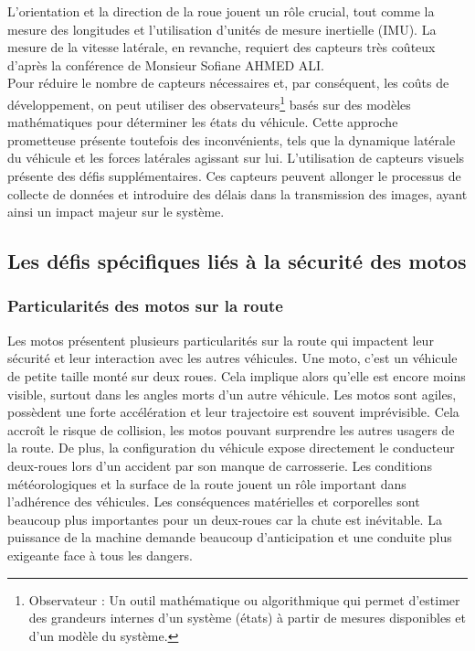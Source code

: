 L'orientation et la direction de la roue jouent un rôle crucial, tout comme la mesure des longitudes et l'utilisation d'unités de mesure inertielle (IMU). La mesure de la vitesse latérale, en revanche, requiert des capteurs très coûteux d'après la conférence\cite{ahmed_ali_synthese_2024} de Monsieur Sofiane AHMED ALI.\\
Pour réduire le nombre de capteurs nécessaires et, par conséquent, les coûts de développement, on peut utiliser des observateurs\footnote{Observateur : Un outil mathématique ou algorithmique qui permet d’estimer des grandeurs internes d’un système (états) à partir de mesures disponibles et d’un modèle du système.} basés sur des modèles mathématiques pour déterminer les états du véhicule. Cette approche prometteuse présente toutefois des inconvénients, tels que la dynamique latérale du véhicule et les forces latérales agissant sur lui.
L'utilisation de capteurs visuels présente des défis supplémentaires. Ces capteurs peuvent allonger le processus de collecte de données et introduire des délais dans la transmission des images, ayant ainsi un impact majeur sur le système.


\newpage
\subsection{Les défis spécifiques liés à la sécurité des motos}

\subsubsection{Particularités des motos sur la route}
Les motos présentent plusieurs particularités sur la route qui impactent leur sécurité et leur interaction avec les autres véhicules.
Une moto, c'est un véhicule de petite taille monté sur deux roues. Cela implique alors qu'elle est encore moins visible, surtout dans les angles morts d'un autre véhicule. Les motos sont agiles, possèdent une forte accélération et leur trajectoire est souvent imprévisible.  Cela accroît le risque de collision, les motos pouvant surprendre les autres usagers de la route. De plus, la configuration du véhicule expose directement le conducteur deux-roues lors d'un accident par son manque de carrosserie. Les conditions météorologiques et la surface de la route jouent un rôle important dans l'adhérence des véhicules. Les conséquences matérielles et corporelles sont beaucoup plus importantes pour un deux-roues car la chute est inévitable.
La puissance de la machine demande beaucoup d'anticipation et une conduite plus exigeante face à tous les dangers.\\

